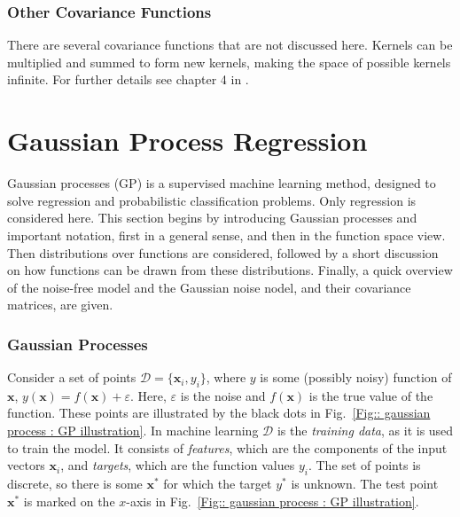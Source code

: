 \documentclass[twoside,english]{uiofysmaster}
\begin{document}
\subsubsection{Other Covariance Functions}

There are several covariance functions that are not discussed here. Kernels can be multiplied and summed to form new kernels, making the space of possible kernels infinite. For further details see chapter 4 in \cite{rasmussen2006gaussian}.




\section{Gaussian Process Regression}\label{Sec: gaussian process : Gaussian Process Regression}

Gaussian processes (GP) is a supervised machine learning method, designed to solve regression and probabilistic classification problems. Only regression is considered here. This section begins by introducing Gaussian processes and important notation, first in a general sense, and then in the function space view. Then distributions over functions are considered, followed by a short discussion on how functions can be drawn from these distributions. Finally, a quick overview of the noise-free model and the Gaussian noise nodel, and their covariance matrices, are given.

\subsubsection{Gaussian Processes}\label{Sec:: gaussian process : Gaussian Processes}

Consider a set of points $\mathcal{D} = \{\textbf{x}_i, y_i\}$, where $y$ is some (possibly noisy) function of $\textbf{x}$, $y(\textbf{x}) = f(\textbf{x}) + \varepsilon$. Here, $\varepsilon$ is the noise and $f(\textbf{x})$ is the true value of the function. These points are illustrated by the black dots in Fig.~\ref{Fig:: gaussian process : GP illustration}. In machine learning $\mathcal{D}$ is the \textit{training data}, as it is used to train the model. It consists of \textit{features}, which are the components of the input vectors $\textbf{x}_i$, and \textit{targets}, which are the function values $y_i$. The set of points is discrete, so there is some $\textbf{x}^*$ for which the target $y^*$ is unknown. The test point $\textbf{x}^*$ is marked on the $x$-axis in Fig.~\ref{Fig:: gaussian process : GP illustration}.
\end{document}
